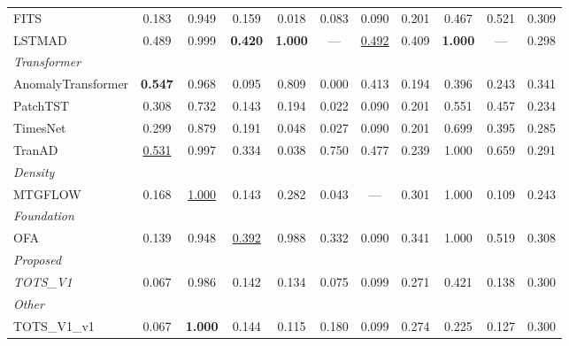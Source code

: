 \begin{table}[t]
\begin{tabular}{lcccccccccc}
FITS & 0.183 & 0.949 & 0.159 & 0.018 & 0.083 & 0.090 & 0.201 & 0.467 & 0.521 & 0.309 \\
LSTMAD & 0.489 & 0.999 & \textbf{0.420} & \textbf{1.000} & --- & \underline{0.492} & 0.409 & \textbf{1.000} & --- & 0.298 \\
\midrule
\multicolumn{11}{l}{\textit{Transformer}} \\
AnomalyTransformer & \textbf{0.547} & 0.968 & 0.095 & 0.809 & 0.000 & 0.413 & 0.194 & 0.396 & 0.243 & 0.341 \\
PatchTST & 0.308 & 0.732 & 0.143 & 0.194 & 0.022 & 0.090 & 0.201 & 0.551 & 0.457 & 0.234 \\
TimesNet & 0.299 & 0.879 & 0.191 & 0.048 & 0.027 & 0.090 & 0.201 & 0.699 & 0.395 & 0.285 \\
TranAD & \underline{0.531} & 0.997 & 0.334 & 0.038 & 0.750 & 0.477 & 0.239 & 1.000 & 0.659 & 0.291 \\
\midrule
\multicolumn{11}{l}{\textit{Density}} \\
MTGFLOW & 0.168 & \underline{1.000} & 0.143 & 0.282 & 0.043 & --- & 0.301 & 1.000 & 0.109 & 0.243 \\
\midrule
\multicolumn{11}{l}{\textit{Foundation}} \\
OFA & 0.139 & 0.948 & \underline{0.392} & 0.988 & 0.332 & 0.090 & 0.341 & 1.000 & 0.519 & 0.308 \\
\midrule
\multicolumn{11}{l}{\textit{Proposed}} \\
\textit{TOTS\_V1} & 0.067 & 0.986 & 0.142 & 0.134 & 0.075 & 0.099 & 0.271 & 0.421 & 0.138 & 0.300 \\
\midrule
\multicolumn{11}{l}{\textit{Other}} \\
TOTS\_V1\_v1 & 0.067 & \textbf{1.000} & 0.144 & 0.115 & 0.180 & 0.099 & 0.274 & 0.225 & 0.127 & 0.300 \\
\bottomrule
\end{tabular}
\end{table}
